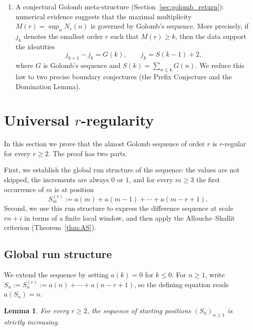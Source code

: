 \documentclass[12pt]{article}
\newtheorem{lemma}[theorem]{Lemma}
\theoremstyle{definition}
\theoremstyle{remark}
\begin{document}
\begin{enumerate}
        (Section~\ref{sec:combinatorial}): a second-bit characterization of
        multiplicities and a Boolean cellular automaton for $r=2$,
        and a palindromic substitution rule for $r=3$.
  \item A conjectural Golomb meta-structure (Section~\ref{sec:golomb_return}):
        numerical evidence suggests that the maximal multiplicity
        $M(r)=\sup_n N_r(n)$ is governed by Golomb's sequence.
        More precisely, if $j_k$ denotes the smallest order $r$ such that
        $M(r)\ge k$, then the data support the identities
        \[
          j_{k+1}-j_k = G(k), \qquad j_k = S(k-1)+2,
        \]
        where $G$ is Golomb's sequence and $S(k)=\sum_{n\le k}G(n)$.
        We reduce this law to two precise boundary conjectures
        (the Prefix Conjecture and the Domination Lemma).
\end{enumerate}

\section{Universal $r$-regularity}\label{sec:general}

In this section we prove that the almost Golomb sequence of order $r$ is
$r$-regular for every $r\ge 2$. The proof has two parts.

First, we establish the global run structure of the sequence: the values are
not skipped, the increments are always $0$ or $1$, and for every $m\ge 3$
the first occurrence of $m$ is at position
\[
  S_m^{(r)}:=a(m)+a(m-1)+\cdots+a(m-r+1).
\]
Second, we use this run structure to express the
difference sequence at scale $rn+i$ in terms of a finite local window,
and then apply the Allouche--Shallit criterion (Theorem~\ref{thm:AS}).

\subsection{Global run structure}

We extend the sequence by setting $a(k)=0$ for $k\le 0$.
For $n\ge 1$, write $S_n:=S_n^{(r)}:=a(n)+\cdots+a(n-r+1)$,
so the defining equation reads $a(S_n)=n$.

\begin{lemma}\label{lem:anchor-growth}
For every $r\ge 2$, the sequence of starting positions $(S_n)_{n\ge 1}$ is strictly increasing.
\end{lemma}
\end{document}
